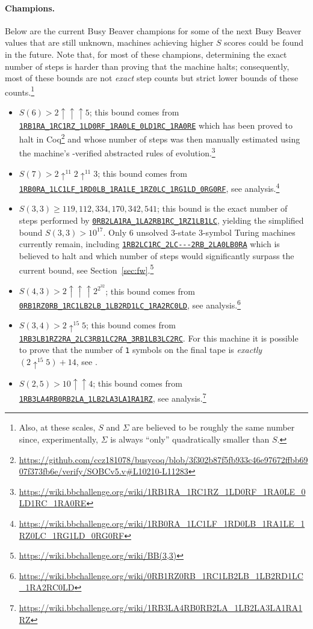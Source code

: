 \documentclass[a4paper,british]{article}
\theoremstyle{definition} %
\numberwithin{equation}{section}
\theoremstyle{definition} %
\newcommand{\tm}[1]{\href{https://bbchallenge.org/#1}{\texttt{\nolinkurl{#1}}}}
\newcommand{\sone}{\texttt{1}\xspace}
\begin{document}
\paragraph{Champions.} Below are the current Busy Beaver champions for some of the next Busy Beaver values that are still unknown, \ie machines achieving higher $S$ scores could be found in the future. Note that, for most of these champions, determining the exact number of steps is harder than proving that the machine halts; consequently, most of these bounds are not \textit{exact} step counts but strict lower bounds of these counts.\footnote{Also, at these scales, $S$ and $\Sigma$ are believed to be roughly the same number since, experimentally, $\Sigma$ is always ``only'' quadratically smaller than $S$.}
\begin{itemize}
    \item $S(6) > 2 \uparrow \uparrow \uparrow 5$; this bound comes from \tm{1RB1RA_1RC1RZ_1LD0RF_1RA0LE_0LD1RC_1RA0RE} which has been proved to halt in Coq\footnote{\url{https://github.com/ccz181078/busycoq/blob/3f302b87f5fb933c46e97672ffbb6907f373fb6e/verify/SOBCv5.v\#L10210-L11283}} and whose number of steps was then manually estimated using the machine's \Coq-verified abstracted rules of evolution.\footnote{\url{https://wiki.bbchallenge.org/wiki/1RB1RA_1RC1RZ_1LD0RF_1RA0LE_0LD1RC_1RA0RE}}
    \item $S(7) > 2 \uparrow^{11} 2 \uparrow^{11} 3$; this bound comes from \tm{1RB0RA_1LC1LF_1RD0LB_1RA1LE_1RZ0LC_1RG1LD_0RG0RF}, see analysis.\footnote{\url{https://wiki.bbchallenge.org/wiki/1RB0RA_1LC1LF_1RD0LB_1RA1LE_1RZ0LC_1RG1LD_0RG0RF}}
    \item $S(3,3) \geq 119{,}112{,}334{,}170{,}342{,}541$; this bound is the exact number of steps performed by \tm{0RB2LA1RA_1LA2RB1RC_1RZ1LB1LC}, yielding the simplified bound $S(3,3) > 10^{17}$. Only 6 unsolved 3-state 3-symbol Turing machines currently remain, including \tm{1RB2LC1RC_2LC---2RB_2LA0LB0RA} which is believed to halt and which number of steps would significantly surpass the current bound, see Section~\ref{sec:fw}.\footnote{\url{https://wiki.bbchallenge.org/wiki/BB(3,3)}}
    \item $S(4,3) > 2 \uparrow \uparrow \uparrow 2^{2^{32}}$; this bound comes from \tm{0RB1RZ0RB_1RC1LB2LB_1LB2RD1LC_1RA2RC0LD}, see analysis.\footnote{\url{https://wiki.bbchallenge.org/wiki/0RB1RZ0RB_1RC1LB2LB_1LB2RD1LC_1RA2RC0LD}}
    \item $S(3,4) > 2 \uparrow^{15} 5$; this bound comes from \tm{1RB3LB1RZ2RA_2LC3RB1LC2RA_3RB1LB3LC2RC}. For this machine it is possible to prove that the number of \sone symbols on the final tape is \textit{exactly} $(2 \uparrow^{15} 5) + 14$, see \cite{ligocki2024bb34ack14}.
    \item $S(2,5) > 10 \uparrow \uparrow 4$; this bound comes from \tm{1RB3LA4RB0RB2LA_1LB2LA3LA1RA1RZ}, see analysis.\footnote{\url{https://wiki.bbchallenge.org/wiki/1RB3LA4RB0RB2LA_1LB2LA3LA1RA1RZ}}
\end{itemize}
\end{document}
